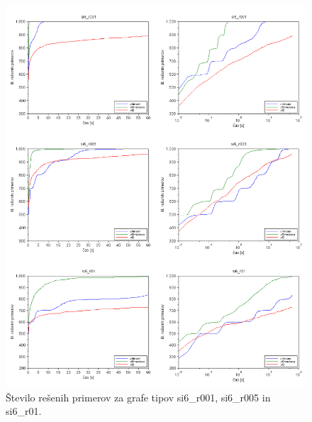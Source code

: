 \documentclass[a4paper, 12pt, ]{book}
\begin{document}
\begin{figure}
\begin{center}
\includegraphics[width=15cm]{img/results_si6.png}
\end{center}
\caption{Število rešenih primerov za grafe tipov si6\_r001, si6\_r005 in si6\_r01.}
\label{pic_res_si6}
\end{figure}
\end{document}
